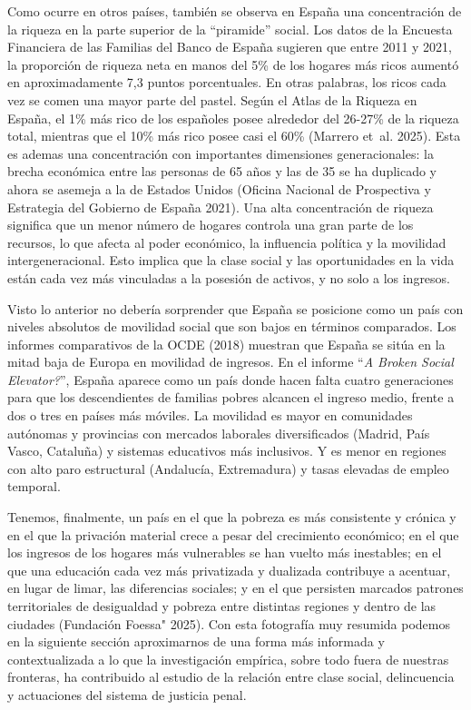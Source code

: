 \documentclass[
  spanish,
  letterpaper,
  DIV=11,
  numbers=noendperiod]{scrreprt}
\begin{document}
Como ocurre en otros países, también se observa en España una
concentración de la riqueza en la parte superior de la ``piramide''
social. Los datos de la Encuesta Financiera de las Familias del Banco de
España sugieren que entre 2011 y 2021, la proporción de riqueza neta en
manos del 5\% de los hogares más ricos aumentó en aproximadamente 7,3
puntos porcentuales. En otras palabras, los ricos cada vez se comen una
mayor parte del pastel. Según el Atlas de la Riqueza en España, el 1\%
más rico de los españoles posee alrededor del 26-27\% de la riqueza
total, mientras que el 10\% más rico posee casi el 60\% (Marrero et~al.
2025). Esta es ademas una concentración con importantes dimensiones
generacionales: la brecha económica entre las personas de 65 años y las
de 35 se ha duplicado y ahora se asemeja a la de Estados Unidos (Oficina
Nacional de Prospectiva y Estrategia del Gobierno de España 2021). Una
alta concentración de riqueza significa que un menor número de hogares
controla una gran parte de los recursos, lo que afecta al poder
económico, la influencia política y la movilidad intergeneracional. Esto
implica que la clase social y las oportunidades en la vida están cada
vez más vinculadas a la posesión de activos, y no solo a los ingresos.

Visto lo anterior no debería sorprender que España se posicione como un
país con niveles absolutos de movilidad social que son bajos en términos
comparados. Los informes comparativos de la OCDE (2018) muestran que
España se sitúa en la mitad baja de Europa en movilidad de ingresos. En
el informe ``\emph{A Broken Social Elevator?}'', España aparece como un
país donde hacen falta cuatro generaciones para que los descendientes de
familias pobres alcancen el ingreso medio, frente a dos o tres en países
más móviles. La movilidad es mayor en comunidades autónomas y provincias
con mercados laborales diversificados (Madrid, País Vasco, Cataluña) y
sistemas educativos más inclusivos. Y es menor en regiones con alto paro
estructural (Andalucía, Extremadura) y tasas elevadas de empleo
temporal.

Tenemos, finalmente, un país en el que la pobreza es más consistente y
crónica y en el que la privación material crece a pesar del crecimiento
económico; en el que los ingresos de los hogares más vulnerables se han
vuelto más inestables; en el que una educación cada vez más privatizada
y dualizada contribuye a acentuar, en lugar de limar, las diferencias
sociales; y en el que persisten marcados patrones territoriales de
desigualdad y pobreza entre distintas regiones y dentro de las ciudades
(Fundación Foessa" 2025). Con esta fotografía muy resumida podemos en la
siguiente sección aproximarnos de una forma más informada y
contextualizada a lo que la investigación empírica, sobre todo fuera de
nuestras fronteras, ha contribuido al estudio de la relación entre clase
social, delincuencia y actuaciones del sistema de justicia penal.
\end{document}

